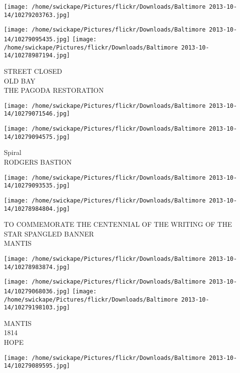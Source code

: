 \documentclass[10pt,letterpaper]{article}
\begin{document}
\texttt{[image: /home/swickape/Pictures/flickr/Downloads/Baltimore 2013-10-14/10279203763.jpg]}

\vspace{0.25in}
\texttt{[image: /home/swickape/Pictures/flickr/Downloads/Baltimore 2013-10-14/10279095435.jpg]}
\texttt{[image: /home/swickape/Pictures/flickr/Downloads/Baltimore 2013-10-14/10278987194.jpg]}

STREET CLOSED\\
OLD BAY\\
THE PAGODA RESTORATION\\
\pagebreak

\texttt{[image: /home/swickape/Pictures/flickr/Downloads/Baltimore 2013-10-14/10279071546.jpg]}

\vspace{0.25in}
\texttt{[image: /home/swickape/Pictures/flickr/Downloads/Baltimore 2013-10-14/10279094575.jpg]}

Spiral\\
RODGERS BASTION\\
\pagebreak

\texttt{[image: /home/swickape/Pictures/flickr/Downloads/Baltimore 2013-10-14/10279093535.jpg]}

\vspace{0.25in}
\texttt{[image: /home/swickape/Pictures/flickr/Downloads/Baltimore 2013-10-14/10278984804.jpg]}

TO COMMEMORATE THE CENTENNIAL OF THE WRITING OF THE STAR SPANGLED BANNER\\
MANTIS\\
\pagebreak

\texttt{[image: /home/swickape/Pictures/flickr/Downloads/Baltimore 2013-10-14/10278983874.jpg]}

\vspace{0.25in}
\texttt{[image: /home/swickape/Pictures/flickr/Downloads/Baltimore 2013-10-14/10279068036.jpg]}
\texttt{[image: /home/swickape/Pictures/flickr/Downloads/Baltimore 2013-10-14/10279198103.jpg]}

MANTIS\\
1814\\
HOPE\\
\pagebreak

\texttt{[image: /home/swickape/Pictures/flickr/Downloads/Baltimore 2013-10-14/10279089595.jpg]}
\end{document}
